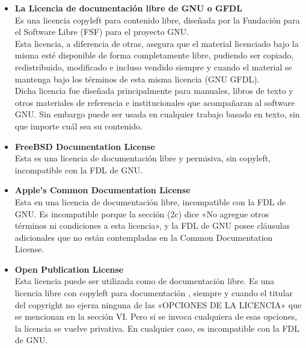 \begin{itemize}
\item {\bf La Licencia de documentación libre de GNU o GFDL}\\
Es una licencia copyleft para contenido libre, diseñada por la Fundación para el Software Libre (FSF) para el proyecto GNU. \\
Esta licencia, a diferencia de otras, asegura que el material licenciado bajo la misma esté disponible de forma completamente libre, pudiendo ser copiado, redistribuido, modificado e incluso vendido siempre y cuando el material se mantenga bajo los términos de esta misma licencia (GNU GFDL). \\
Dicha licencia fue diseñada principalmente para manuales, libros de texto y otros materiales de referencia e institucionales que acompañaran al software GNU. Sin embargo puede ser usada en cualquier trabajo basado en texto, sin que importe cuál sea su contenido.
\item {\bf FreeBSD Documentation License}\\
Esta es una licencia de documentación libre y permisiva, sin copyleft, incompatible con la FDL de GNU.
\item {\bf Apple's Common Documentation License}\\
Esta en una licencia de documentación libre, incompatible con la FDL de GNU. Es incompatible porque la sección (2c) dice «No agregue otros términos ni condiciones a esta licencia», y la FDL de GNU posee cláusulas adicionales que no están contempladas en la Common Documentation License.
\item {\bf Open Publication License}\\
Esta licencia puede ser utilizada como de documentación libre. Es una licencia libre con copyleft para documentación , siempre y cuando el titular del copyright no ejerza ninguna de las «OPCIONES DE LA LICENCIA» que se mencionan en la sección VI. Pero si se invoca cualquiera de esas opciones, la licencia se vuelve privativa. En cualquier caso, es incompatible con la FDL de GNU.
    
\end{itemize}

